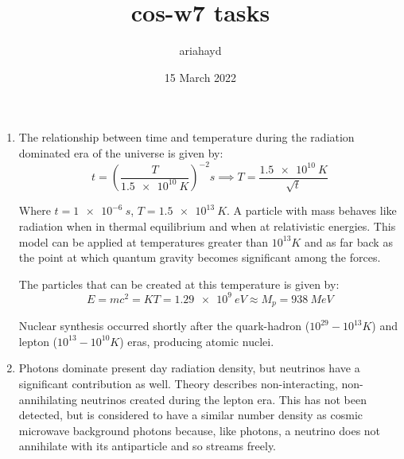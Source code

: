 \documentclass{paper}
\title{cos-w7 tasks}
\author{ariahayd}
\date{15 March 2022}
\begin{document}
 

\maketitle

\begin{enumerate}
    \item %
      The relationship between time and temperature during the radiation
      dominated era of the universe is given by:
      \[
        t = \left(\frac{T}{\SI{1.5e10}{K}}\right)^{-2}\si{s} \implies
        T = \frac{\SI{1.5e10}{K}}{\sqrt{t}}
      \]

      Where \(t=\SI{1e-6}{s}\), \(T=\SI{1.5e13}{K}\). A particle with mass
      behaves like radiation when in thermal equilibrium and when at 
      relativistic energies. This model can be applied at temperatures
      greater than \(10^{13}\si{K}\) and as far back as the point at which
      quantum gravity becomes significant among the forces.

      The particles that can be created at this temperature is given by:
      \[
        E = m c^2 = K T = \SI{1.29e9}{eV} \approx M_p = \SI{938}{MeV}
      \]

      Nuclear synthesis occurred shortly after the quark-hadron
      (\(10^{29}-10^{13}\si{K}\)) and lepton (\(10^{13}-10^{10}\si{K}\)) eras,
      producing atomic nuclei.

    \item %
      Photons dominate present day radiation density, but neutrinos have a 
      significant contribution as well. Theory describes non-interacting,
      non-annihilating neutrinos created during the lepton era. This has not
      been detected, but is considered to have a similar number density as
      cosmic microwave background photons because, like photons, a neutrino
      does not annihilate with its antiparticle and so streams freely.


\end{enumerate}
\end{document}
